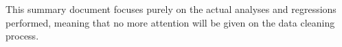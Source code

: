 \documentclass[
  letterpaper,
  DIV=11,
  numbers=noendperiod]{scrartcl}
\begin{document}
This summary document focuses purely on the actual analyses and
regressions performed, meaning that no more attention will be given on
the data cleaning process.

\subsection{}\label{section}
\end{document}
